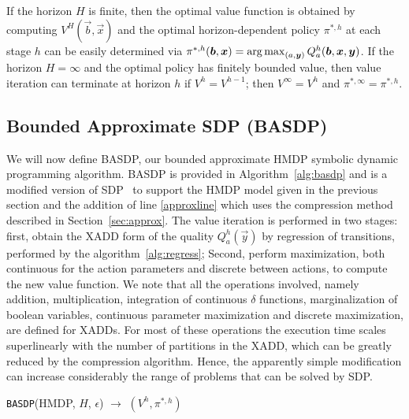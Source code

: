 If the horizon $H$ is finite, then the optimal value function is
obtained by computing $V^H(\vec{b},\vec{x})$ and the optimal
horizon-dependent policy $\pi^{*,h}$ at each stage $h$ can be easily
determined via $\pi^{*,h}(\vec{b},\vec{x}) = \argmax_{(a, \vec{y} )}
Q^h_a(\vec{b},\vec{x},\vec{y})$.  If the horizon $H = \infty$ and the
optimal policy has finitely bounded value, then value iteration can
terminate at horizon $h$ if $V^{h} = V^{h-1}$; then $V^\infty = V^h$
and $\pi^{*,\infty} = \pi^{*,h}$.

\subsection{Bounded Approximate SDP (BASDP)}

We will now define BASDP, our bounded approximate HMDP symbolic dynamic
programming algorithm.  BASDP is provided in Algorithm~\ref{alg:basdp}
and is a modified version of SDP~\cite{zamani12} to support the HMDP
model given in the previous section and the addition of line \ref{approxline} which
uses the compression method described in Section~\ref{sec:approx}. The
value iteration is performed in two stages: first, obtain the XADD
form of the quality $Q^h_a(\vec{y})$ by regression of transitions,
performed by the algorithm~\ref{alg:regress}; Second, perform
maximization, both continuous for the action parameters and discrete
between actions, to compute the new value function. We note that all
the operations involved, namely addition, multiplication, integration
of continuous $\delta$ functions, marginalization of boolean
variables, continuous parameter maximization and discrete
maximization, are defined for XADDs. For most of these operations the
execution time scales superlinearly with the number of partitions in
the XADD, which can be greatly reduced by the compression
algorithm. Hence, the apparently simple modification can increase
considerably the range of problems that can be solved by SDP.

\incmargin{.5em}
\linesnumbered
\begin{algorithm}[th!]
\vspace{-.5mm}
\dontprintsemicolon
{}
\caption{\footnotesize \texttt{BASDP}(HMDP, $H$, $\epsilon$) $\longrightarrow$ $(V^h,\pi^{*,h})$ \label{alg:basdp}}
\vspace{-1mm}
\end{algorithm}
\decmargin{.5em}

